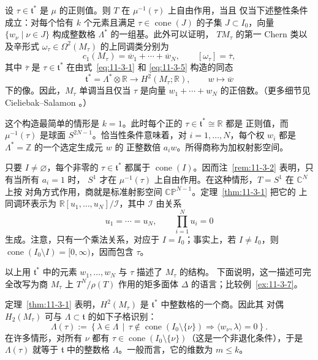 \begin{remark}\label{rem:11-3-2}
设 $\tau\in\mathfrak t^*$ 是 $\mu$ 的正则值。则 $T$ 在 $\mu^{-1}(\tau)$ 上自由作用，当且
仅当下述整性条件成立：对每个恰有 $k$ 个元素且满足
$\tau\in\operatorname{cone}(J)$ 的子集 $J\subset I_0$，向量
$\{w_\nu\mid\nu\in J\}$ 构成整数格 $\Lambda^*$ 的一组基。此外可以证明，
$TM_\tau$ 的第一 Chern 类以及辛形式
$\omega_\tau\in\Omega^2(M_\tau)$ 的上同调类分别为
\[
  c_1(M_\tau)=\overline w_1+\cdots+\overline w_N,
  \qquad [\omega_\tau]=\overline\tau,
\]
其中 $\overline\tau$ 是 $\tau\in\mathfrak t^*$ 在由式~\eqref{eq:11-3-1} 和
\eqref{eq:11-3-5} 构造的同态
\[
  \mathfrak t^*=\Lambda^*\otimes\mathbb R
  \longrightarrow H^2(M_\tau;\mathbb R),\qquad w\longmapsto\overline w
\]
下的像。因此，$M_\tau$ 单调当且仅当 $\tau$ 是向量
$w_1+\cdots+w_N$ 的正倍数。（更多细节见 Cieliebak--Salamon
。）
\end{remark}

\begin{example}\label{ex:11-3-3}
这个构造最简单的情形是 $k=1$。此时每个正的 $\tau\in\mathfrak t^*\cong\mathbb R$ 都是
正则值，而 $\mu^{-1}(\tau)$ 是球面 $S^{2N-1}$。恰当性条件意味着，对
$i=1,\ldots,N$，每个权 $w_i$ 都是 $\Lambda^*=\mathbb Z$ 的一个选定生成元 $w$ 的
正整数倍 $a_iw$。所得商称为加权射影空间。

只要 $I\ne\varnothing$，每个非零的 $\tau\in\mathfrak t^*$ 都属于
$\operatorname{cone}(I)$。因而注~\ref{rem:11-3-2} 表明，只有当所有 $a_i=1$ 时，
$S^1$ 才在 $\mu^{-1}(\tau)$ 上自由作用。在这种情形，$T=S^1$ 在 $\mathbb C^N$ 上按
对角方式作用，商就是标准射影空间 $\mathbb{CP}^{N-1}$。定理~\ref{thm:11-3-1} 把它的
上同调环表示为 $\mathbb R[u_1,\ldots,u_N]/\mathcal I$，其中 $\mathcal I$ 由关系
\[
  u_1=\cdots=u_N,\qquad \prod_{i=1}^N u_i=0
\]
生成。注意，只有一个乘法关系，对应于 $I=I_0$；事实上，若 $I\ne I_0$，则
$\operatorname{cone}(I_0\setminus I)=[0,\infty)$，因而包含 $\tau$。
\end{example}

以上用 $\mathfrak t^*$ 中的元素 $w_1,\ldots,w_N$ 与 $\tau$ 描述了 $M_\tau$ 的结构。
下面说明，这一描述可完全改写为商 $M_\tau$ 上 $T^N/\rho(T)$ 作用的矩多面体 $\Delta$
的语言；比较例~\ref{ex:11-3-7}。

定理~\ref{thm:11-3-1} 表明，$H^2(M_\tau)$ 是 $\mathfrak t^*$ 中整数格的一个商。因此其
对偶 $H_2(M_\tau)$ 可与 $\Lambda\subset\mathfrak t$ 的如下子格识别：
\[
  \Lambda(\tau):=\left\{\lambda\in\Lambda\,\middle|\,
  \tau\notin\operatorname{cone}(I_0\setminus\{\nu\})
  \Longrightarrow\langle w_\nu,\lambda\rangle=0\right\}.
\]
在许多情形，对所有 $\nu$ 都有
$\tau\in\operatorname{cone}(I_0\setminus\{\nu\})$（这是一个非退化条件），于是
$\Lambda(\tau)$ 就等于 $\mathfrak t$ 中的整数格 $\Lambda$。一般而言，它的维数为
$m\leq k$。

